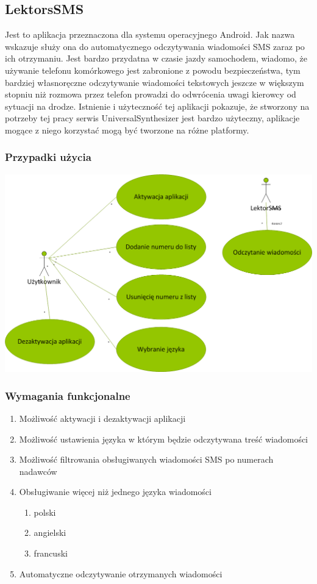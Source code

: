 \subsection{LektorsSMS}
Jest to aplikacja przeznaczona dla systemu operacyjnego Android. Jak nazwa wskazuje służy ona do automatycznego odczytywania wiadomości SMS zaraz po ich otrzymaniu. Jest bardzo przydatna w czasie jazdy samochodem, wiadomo, że używanie telefonu komórkowego jest zabronione z powodu bezpieczeństwa, tym bardziej własnoręczne odczytywanie wiadomości tekstowych jeszcze w większym stopniu niż rozmowa przez telefon prowadzi do odwrócenia uwagi kierowcy od sytuacji na drodze. Istnienie i użyteczność tej aplikacji pokazuje, że stworzony na potrzeby tej pracy serwis UniversalSynthesizer jest bardzo użyteczny, aplikacje mogące z niego korzystać mogą być tworzone na różne platformy.
\subsubsection{Przypadki użycia}
\includegraphics[scale=0.55]{useCaseLektorSMS.png} 
\subsubsection{Wymagania funkcjonalne}
\begin{enumerate}
	\item Możliwość aktywacji i dezaktywacji aplikacji
	\item Możliwość ustawienia języka w którym będzie odczytywana treść wiadomości
	\item Możliwość filtrowania obsługiwanych wiadomości SMS po numerach nadawców 
	\item Obsługiwanie więcej niż jednego języka wiadomości
		\begin{enumerate}
			\item polski
			\item angielski
			\item francuski
		\end{enumerate}
	\item Automatyczne odczytywanie otrzymanych wiadomości
\end{enumerate}

